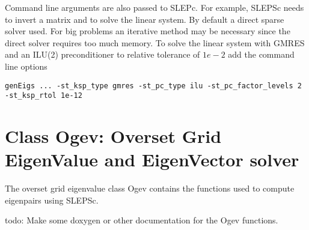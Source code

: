 \documentclass[preprint,11pt]{elsarticle}
\newcommand{\red}{\color{red}}
\begin{document}
\mni
Command line arguments are also passed to SLEPc. For example, SLEPSc needs to invert a matrix and 
to solve the linear system. By default a direct sparse solver used.
For big problems an iterative method may be necessary since the direct solver requires too much memory.
To solve the linear system with GMRES and an ILU(2) preconditioner to relative tolerance of $1e-2$ add the
command line options
\begin{Verbatim}[fontsize=\footnotesize]
  genEigs ... -st_ksp_type gmres -st_pc_type ilu -st_pc_factor_levels 2 -st_ksp_rtol 1e-12
\end{Verbatim}
% 



\clearpage
\section{Class Ogev: Overset Grid EigenValue and EigenVector solver}  \label{sec:Ogev}

The overset grid eigenvalue class Ogev contains the functions used to compute eigenpairs using SLEPSc.

\mni
{\red todo: Make some doxygen or other documentation for the Ogev functions.}
\end{document}
